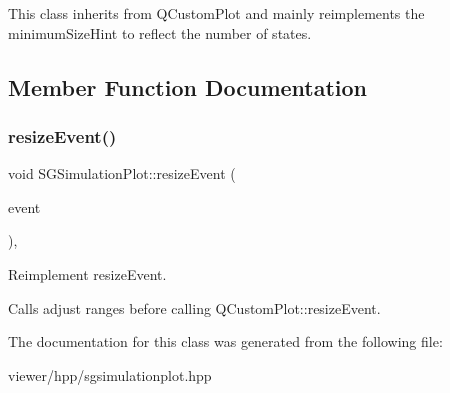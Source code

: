 This class inherits from Q\+Custom\+Plot and mainly reimplements the minimum\+Size\+Hint to reflect the number of states. 

\subsection{Member Function Documentation}
\mbox{\label{classSGSimulationPlot_a941b3cca099b11618dd16ea9de9ebe91}} 
\subsubsection{\texorpdfstring{resize\+Event()}{resizeEvent()}}
{\footnotesize\ttfamily void S\+G\+Simulation\+Plot\+::resize\+Event (\begin{DoxyParamCaption}\item[{Q\+Resize\+Event $\ast$}]{event }\end{DoxyParamCaption})\hspace{0.3cm}{\ttfamily [inline]}, {\ttfamily [protected]}}



Reimplement resize\+Event. 

Calls adjust ranges before calling Q\+Custom\+Plot\+::resize\+Event. 

The documentation for this class was generated from the following file\+:\begin{DoxyCompactItemize}
\item 
viewer/hpp/sgsimulationplot.\+hpp\end{DoxyCompactItemize}
